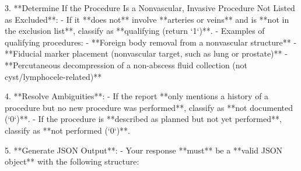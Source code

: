 \begin{mdframed}[]
3. **Determine If the Procedure Is a Nonvascular, Invasive Procedure Not Listed as Excluded**:  
   - If it **does not** involve **arteries or veins** and is **not in the exclusion list**, classify as **qualifying (return `1`)**.  
   - Examples of qualifying procedures:  
     - **Foreign body removal from a nonvascular structure**  
     - **Fiducial marker placement (nonvascular target, such as lung or prostate)**  
     - **Percutaneous decompression of a non-abscess fluid collection (not cyst/lymphocele-related)**  

4. **Resolve Ambiguities**:  
   - If the report **only mentions a history of a procedure but no new procedure was performed**, classify as **not documented (`0`)**.  
   - If the procedure is **described as planned but not yet performed**, classify as **not performed (`0`)**.  

5. **Generate JSON Output**:  
   - Your response **must** be a **valid JSON object** with the following structure:  

\end{mdframed}

